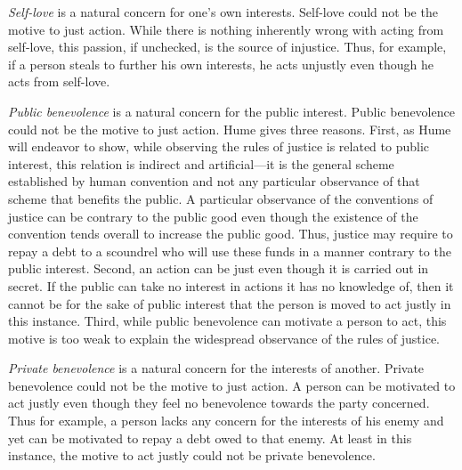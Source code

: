 \emph{Self-love} is a natural concern for one’s own interests. Self-love could not be the motive to just action. While there is nothing inherently wrong with acting from self-love, this passion, if unchecked, is the source of injustice. Thus, for example, if a person steals to further his own interests, he acts unjustly even though he acts from self-love.

\emph{Public benevolence} is a natural concern for the public interest. Public benevolence could not be the motive to just action. Hume gives three reasons. First, as Hume will endeavor to show, while observing the rules of justice is related to public interest, this relation is indirect and artificial---it is the general scheme established by human convention and not any particular observance of that scheme that benefits the public. A particular observance of the conventions of justice can be contrary to the public good even though the existence of the convention tends overall to increase the public good. Thus, justice may require to repay a debt to a scoundrel who will use these funds in a manner contrary to the public interest. Second, an action can be just even though it is carried out in secret. If the public can take no interest in actions it has no knowledge of, then it cannot be for the sake of public interest that the person is moved to act justly in this instance. Third, while public benevolence can motivate a person to act, this motive is too weak to explain the widespread observance of the rules of justice.

\emph{Private benevolence} is a natural concern for the interests of another. Private benevolence could not be the motive to just action. A person can be motivated to act justly even though they feel no benevolence towards the party concerned. Thus for example, a person lacks any concern for the interests of his enemy and yet can be motivated to repay a debt owed to that enemy. At least in this instance, the motive to act justly could not be private benevolence. \change

% 

